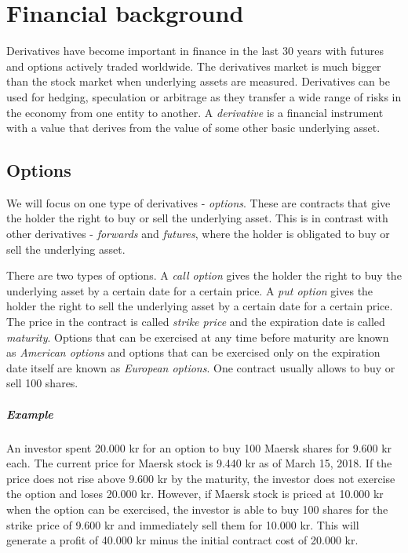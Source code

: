 \chapter{Financial background}

Derivatives have become important in finance in the last 30 years with futures and options actively traded worldwide. The derivatives market is much bigger than the stock market when underlying assets are measured. Derivatives can be used for hedging, speculation or arbitrage as they transfer a wide range of risks in the economy from one entity to another. A \textit{derivative} is a financial instrument with a value that derives from the value of some other basic underlying asset.~\cite[pg.1]{ofod}

\section{Options}
We will focus on one type of derivatives - \textit{options}. These are contracts that give the holder the right to buy or sell the underlying asset. This is in contrast with other derivatives - \textit{forwards} and \textit{futures}, where the holder is obligated to buy or sell the underlying asset.

There are two types of options. A \textit{call option} gives the holder the right to buy the underlying asset by a certain date for a certain price. A \textit{put option} gives the holder the right to sell the underlying asset by a certain date for a certain price. The price in the contract is called \textit{strike price} and the expiration date is called \textit{maturity}. Options that can be exercised at any time before maturity are known as \textit{American options} and options that can be exercised only on the expiration date itself are known as \textit{European options}. One contract usually allows to buy or sell 100 shares.~\cite[pg.7-8]{ofod}

\paragraph{Example}
An investor spent 20.000 kr for an option to buy 100 Maersk shares for 9.600 kr each. The current price for Maersk stock is 9.440 kr as of March 15, 2018. If the price does not rise above 9.600 kr by the maturity, the investor does not exercise the option and loses 20.000 kr. However, if Maersk stock is priced at 10.000 kr when the option can be exercised, the investor is able to buy 100 shares for the strike price of 9.600 kr and immediately sell them for 10.000 kr. This will generate a profit of 40.000 kr minus the initial contract cost of 20.000 kr.

